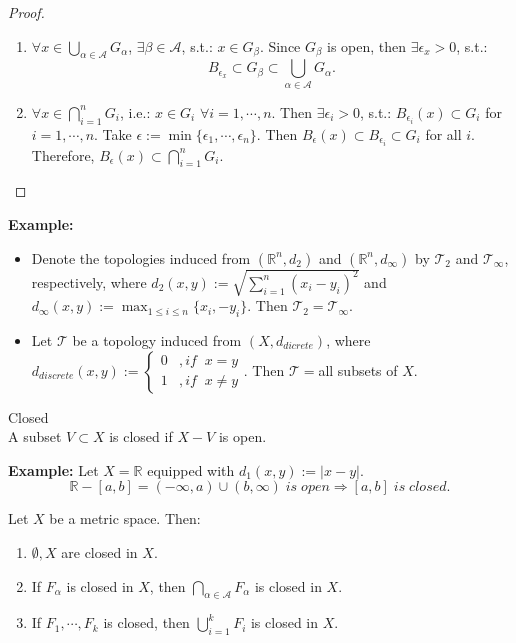 \begin{proof}
    \begin{enumerate}
        \item $\forall x\in \bigcup_{\alpha \in \mathcal{A}} G_\alpha$, $\exists \beta \in \mathcal{A}$, s.t.: $x \in G_\beta$. Since $G_\beta$ is open, then $\exists\epsilon_x >0$, s.t.: 
        $$B_{\epsilon_x} \subset G_\beta \subset \bigcup_{\alpha \in \mathcal{A}} G_\alpha.$$
        \item $\forall x \in \bigcap_{i=1}^nG_i$, i.e.: $x\in G_i$ $\forall i= 1,\cdots,n$. Then $\exists \epsilon_i >0$, s.t.: $B_{\epsilon_i}(x) \subset G_i$ for $i=1,\cdots,n$. Take $\epsilon := \min\{\epsilon_1,\cdots, \epsilon_n\}$. Then $B_\epsilon(x) \subset B_{\epsilon_i} \subset G_i$ for all $i$. Therefore, $B_\epsilon (x) \subset \bigcap_{i=1}^nG_i$.
    \end{enumerate}
\end{proof}

\noindent \textbf{Example:}
\begin{itemize}
    \item Denote the topologies induced from $(\mathbb{R}^n,d_2)$ and $(\mathbb{R}^n,d_\infty)$ by $\mathcal{T}_2$ and $\mathcal{T}_\infty$, respectively, where $d_2(x,y):= \sqrt{\sum_{i=1}^n(x_i-y_i)^2}$ and $d_\infty (x,y):= \max_{1\leq i\leq n}\{x_i,-y_i\}$. Then $\mathcal{T}_2 =\mathcal{T}_\infty$.
    \item Let $\mathcal{T}$ be a topology induced from $(X,d_{dicrete})$, where $d_{discrete}(x,y) := \begin{cases}
        0 &,if\;\; x=y\\
        1 &,if\;\; x\neq y
    \end{cases}$. Then $\mathcal{T}=${all subsets of $X$}.
\end{itemize}

\begin{definition}{Closed}\\
A subset $V \subset X$ is closed if $X-V$ is open.
\end{definition}

\noindent\textbf{Example:} Let $X=\mathbb{R}$ equipped with $d_1(x,y):= |x-y|$.$$\mathbb{R}-[a,b] = (-\infty,a) \cup (b,\infty) \; is \; open \Rightarrow [a,b] \; is \; closed.$$

\begin{proposition}
    Let $X$ be a metric space. Then:
    \begin{enumerate}
        \item $\emptyset,X$ are closed in $X$.
        \item If $F_\alpha$ is closed in $X$, then $\bigcap _{\alpha \in \mathcal{A}}F_\alpha$ is closed in $X$.
        \item If $F_1,\cdots,F_k$ is closed, then $\bigcup_{i=1}^kF_i$ is closed in $X$.
    \end{enumerate}
\end{proposition}

